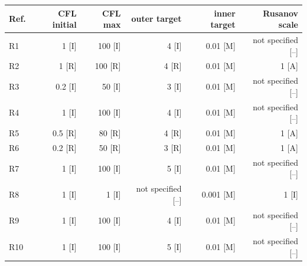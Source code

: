 \begin{center}\small
\begin{tabular}{lrrrrr}
\toprule Ref. & CFL initial & CFL max & outer target & inner target & Rusanov scale\\
\midrule
R1 & 1 [I] & 100 [I] & 4 [I] & 0.01 [M] & not specified [--]\\
R2 & 1 [R] & 100 [R] & 4 [R] & 0.01 [M] & 1 [A]\\
R3 & 0.2 [I] & 50 [I] & 3 [I] & 0.01 [M] & not specified [--]\\
R4 & 1 [I] & 100 [I] & 4 [I] & 0.01 [M] & not specified [--]\\
R5 & 0.5 [R] & 80 [R] & 4 [R] & 0.01 [M] & 1 [A]\\
R6 & 0.2 [R] & 50 [R] & 3 [R] & 0.01 [M] & 1 [A]\\
R7 & 1 [I] & 100 [I] & 5 [I] & 0.01 [M] & not specified [--]\\
R8 & 1 [I] & 1 [I] & not specified [--] & 0.001 [M] & 1 [I]\\
R9 & 1 [I] & 100 [I] & 4 [I] & 0.01 [M] & not specified [--]\\
R10 & 1 [I] & 100 [I] & 5 [I] & 0.01 [M] & not specified [--]\\
\bottomrule
\end{tabular}
\label{tab:control-thresholds}
\end{center}
